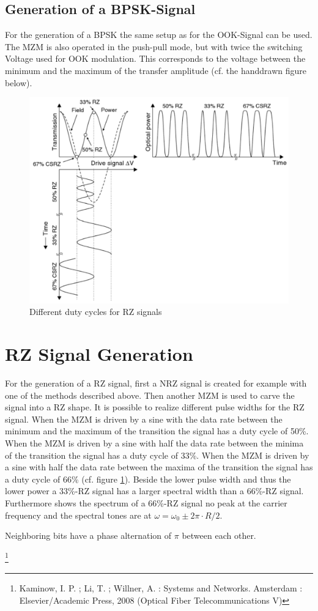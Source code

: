 \subsection{Generation of a BPSK-Signal}
For the generation of a BPSK the same setup as for the OOK-Signal can be used. The MZM is also operated in the push-pull mode, but with twice the switching Voltage used for OOK modulation. This corresponds to the voltage between the minimum and the maximum of the transfer amplitude (cf. the handdrawn figure below).\footnotemark[1]
\newpage
\begin{figure}
  \centering
  \includegraphics[width=.5\columnwidth]{Grafiken/RZ_OOK.jpg}
\caption{Different duty cycles for RZ signals}
\label{fig:RZ_OOK}
\end{figure}

\section{RZ Signal Generation}
\label{sec:RZ}
For the generation of a RZ signal, first a NRZ signal is created for example with one of the methods described above. Then another MZM is used to carve the signal into a RZ shape. It is possible to realize different pulse widths for the RZ signal. When the MZM is driven by a sine with the data rate between the minimum and the maximum of the transition the signal has a duty cycle of 50\%. When the MZM is driven by a sine with half the data rate between the minima of the transition the signal has a duty cycle of 33\%. When the MZM is driven by a sine with half the data rate between the maxima of the transition the signal has a duty cycle of 66\% (cf. figure \ref{fig:RZ_OOK}). Beside the lower pulse width and thus the lower power a 33\%-RZ signal has a larger spectral width than a 66\%-RZ signal. Furthermore shows the spectrum of a 66\%-RZ signal no peak at the carrier frequency and the spectral tones are at $\omega=\omega_0\pm2\pi\cdot R/2$.

Neighboring bits have a phase alternation of $\pi$ between each other. 






\footnote[2]{Kaminow, I. P. ; Li, T. ; Willner, A. : Systems and Networks. Amsterdam :
Elsevier/Academic Press, 2008 (Optical Fiber Telecommunications V)}

